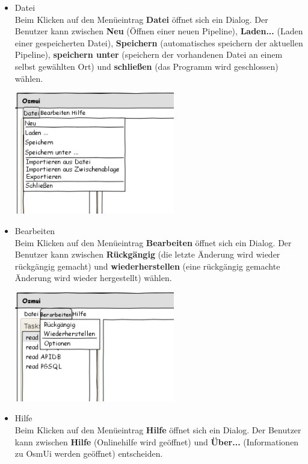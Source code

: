 \documentclass[a4paper,12pt]{scrartcl}
\begin{document}
\begin{itemize}
\item Datei\\
Beim Klicken auf den Menüeintrag \textbf{Datei} öffnet sich ein Dialog. Der Benutzer kann zwischen \textbf{Neu} (Öffnen einer neuen Pipeline), \textbf{Laden...} (Laden einer gespeicherten Datei), \textbf{Speichern} (automatisches speichern der aktuellen Pipeline), \textbf{speichern unter} (speichern der vorhandenen Datei an einem selbst gewählten Ort) und \textbf{schließen} (das Programm wird geschlossen) wählen. 
\\ 
\begin{center}
\includegraphics[width=7cm]{ui_prototype/OsmUi_Dateiklein.png}
\end{center}
\item Bearbeiten\\
Beim Klicken auf den Menüeintrag \textbf{Bearbeiten} öffnet sich ein Dialog. Der Benutzer kann zwischen \textbf{Rückgängig} (die letzte Änderung wird wieder rückgängig gemacht) und \textbf{wiederherstellen} (eine rückgängig gemachte Änderung wird wieder hergestellt) wählen.
\\
\begin{center}
\includegraphics[width=7cm]{ui_prototype/OsmUi_Bearbeitenklein.png}
\end{center}
\item Hilfe\\
Beim Klicken auf den Menüeintrag \textbf{Hilfe} öffnet sich ein Dialog. Der Benutzer kann zwischen \textbf{Hilfe} (Onlinehilfe wird geöffnet) und \textbf{Über...} (Informationen zu OsmUi werden geöffnet) entscheiden.

\end{itemize}
\end{document}
